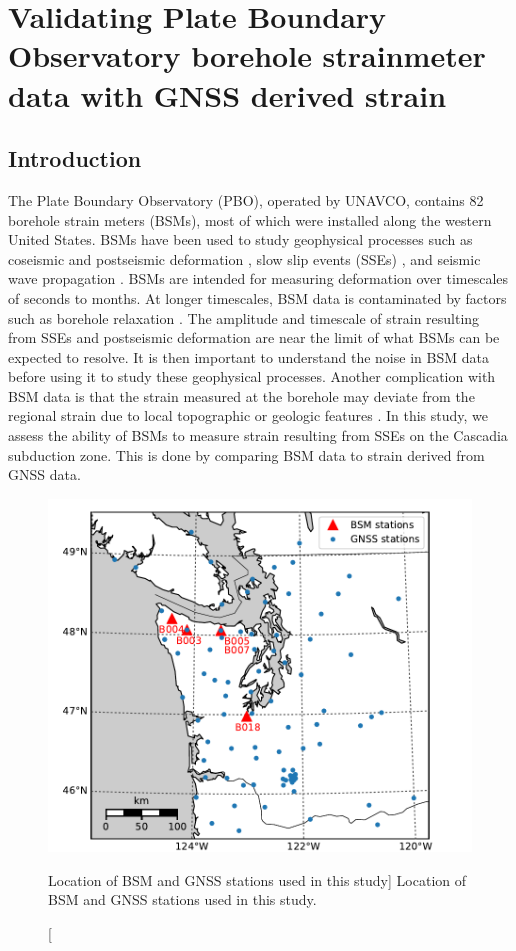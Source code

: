 \chapter{Validating Plate Boundary Observatory borehole
strainmeter data with GNSS derived strain}

\section{Introduction}
The Plate Boundary Observatory (PBO), operated by UNAVCO, contains 82
borehole strain meters (BSMs), most of which were installed along the
western United States. BSMs have been used to study geophysical
processes such as coseismic and postseismic deformation
\citep[e.g.,][]{Langbein2006, Langbein2015}, slow slip events (SSEs)
\citep[e.g.,][]{Dragert2011}, and seismic wave propagation
\citep{Barbour2017}. BSMs are intended for measuring deformation over
timescales of seconds to months. At longer timescales, BSM data is
contaminated by factors such as borehole relaxation
\citep{Gladwin1987}. The amplitude and timescale of strain resulting
from SSEs and postseismic deformation are near the limit of what BSMs
can be expected to resolve. It is then important to understand the
noise in BSM data before using it to study these geophysical
processes. Another complication with BSM data is that the strain
measured at the borehole may deviate from the regional strain due to
local topographic or geologic features \citep{Berger1976}. In this
study, we assess the ability of BSMs to measure strain resulting from
SSEs on the Cascadia subduction zone. This is done by comparing BSM
data to strain derived from GNSS data.

\begin{figure}
\includegraphics{ch6/figures/map.pdf}
\caption
[Location of BSM and GNSS stations used in this study]
{Location of BSM and GNSS stations used in this study.}   
\label{ch6:fig:Map}
\end{figure}

